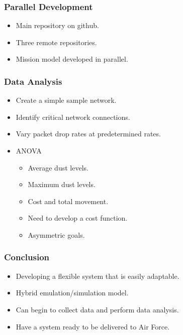 \documentclass{beamer}
\begin{document}
\begin{frame}
  \frametitle{Parallel Development}
  
  \begin{itemize}
  \item Main repository on github.
  \item Three remote repositories.
  \item Mission model developed in parallel.
  \end{itemize}

\end{frame}

\begin{frame}
  \frametitle{Data Analysis}

  \begin{itemize}
  \item Create a simple sample network.
  \item Identify critical network connections.
  \item Vary packet drop rates at predetermined rates.
  \item ANOVA
    \begin{itemize}
    \item Average dust levels.
    \item Maximum dust levels.
    \item Cost and total movement.
    \item Need to develop a cost function.
    \item Asymmetric goals.
    \end{itemize}
  \end{itemize}

\end{frame}

\begin{frame}
  \frametitle{Conclusion}

  \begin{itemize}
  \item Developing a flexible system that is easily adaptable.
  \item Hybrid emulation/simulation model.
  \item Can begin to collect data and perform data analysis.
  \item Have a system ready to be delivered to Air Force.
  \end{itemize}
  
\end{frame}
\end{document}
